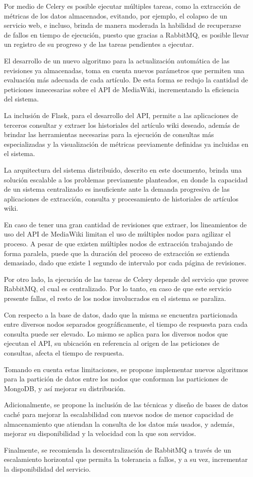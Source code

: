 Por medio de Celery es posible ejecutar múltiples tareas, como la extracción de métricas de los
datos almacenados, evitando, por ejemplo, el colapso de un servicio web, e incluso, brinda
de manera moderada la habilidad de recuperarse de fallos en tiempo de ejecución, puesto que gracias a RabbitMQ,
es posible llevar un registro de su progreso y de las tareas pendientes a ejecutar.

El desarrollo de un nuevo algoritmo para la actualización automática de las revisiones ya almacenadas, toma en cuenta nuevos parámetros que permiten una evaluación más adecuada de cada artículo.
De esta forma se redujo la cantidad de peticiones innecesarias sobre el API de MediaWiki, incrementando la eficiencia del sistema.

La inclusión de Flask, para el desarrollo del API, permite a las aplicaciones de terceros consultar y extraer
los historiales del artículo wiki deseado, además de brindar las herramientas necesarias para la ejecución
de consultas más especializadas y la visualización de métricas previamente definidas ya incluidas en el sistema.

La arquitectura del sistema distribuido, descrito en este documento, brinda
una solución escalable a los problemas previamente planteados, en donde la capacidad
de un sistema centralizado es insuficiente ante la demanda progresiva de las aplicaciones de
extracción, consulta y procesamiento de historiales de artículos wiki.

En caso de tener una gran cantidad de revisiones que extraer, los lineamientos de uso del API de MediaWiki limitan el uso de múltiples nodos para agilizar el proceso.
A pesar de que existen múltiples nodos de extracción trabajando de forma paralela, puede que la duración del proceso de extracción se extienda demasiado, dado que existe 1 segundo de intervalo por cada página de revisiones.

Por otro lado, la ejecución de las tareas de Celery depende del servicio que provee RabbitMQ, el cual es centralizado.
Por lo tanto, en caso de que este servicio presente fallas, el resto de los nodos involucrados en el sistema se paraliza.

Con respecto a la base de datos, dado que la misma se encuentra particionada entre diversos nodos separados geográficamente, el tiempo de respuesta para cada consulta puede ser elevado.
Lo mismo se aplica para los diversos nodos que ejecutan el API, su ubicación en referencia al origen de las peticiones de consultas, afecta el tiempo de respuesta.

Tomando en cuenta estas limitaciones, se propone implementar nuevos algoritmos para la partición de datos entre los nodos que conforman las particiones de MongoDB, y así mejorar su distribución.

Adicionalmente, se propone la inclusión de las técnicas y diseño de bases de datos caché para mejorar la escalabilidad con nuevos nodos de menor capacidad de almacenamiento que atiendan la consulta de los datos más usados, y además, mejorar su disponibilidad y la velocidad con la que son servidos.

Finalmente, se recomienda la descentralización de RabbitMQ a través de un escalamiento horizontal que permita la tolerancia a fallos, y a su vez, incrementar la disponibilidad del servicio.
